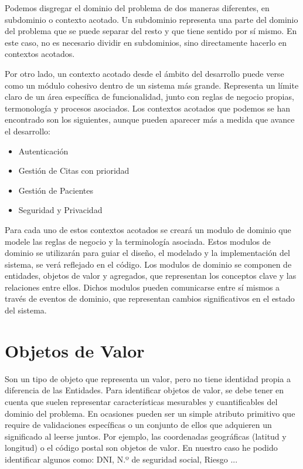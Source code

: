 Podemos disgregar el dominio del problema de dos maneras diferentes, en subdominio o contexto acotado.
Un subdominio representa una parte del dominio del problema que se puede separar del resto y que tiene sentido por sí mismo.
En este caso, no es necesario dividir en subdominios, sino directamente hacerlo en contextos acotados.

Por otro lado, un contexto acotado desde el ámbito del desarrollo puede verse como un módulo cohesivo dentro de un sistema más grande.
Representa un límite claro de un área específica de funcionalidad, junto con reglas de negocio propias, termonología y procesos asociados.
Los contextos acotados que podemos se han encontrado son los siguientes, aunque pueden aparecer más a medida que avance el desarrollo:
\begin{itemize}
    \item Autenticación
    \item Gestión de Citas con prioridad
    \item Gestión de Pacientes
    \item Seguridad y Privacidad
\end{itemize}

Para cada uno de estos contextos acotados se creará un modulo de dominio que modele las reglas de negocio y la terminología asociada.
Estos modulos de dominio se utilizarán para guiar el diseño, el modelado y la implementación del sistema, se verá reflejado en el código.
Los modulos de dominio se componen de entidades, objetos de valor y agregados, que representan los conceptos clave y las relaciones entre ellos.
Dichos modulos pueden comunicarse entre sí mismos a través de eventos de dominio, que representan cambios significativos en el estado del sistema.

\section*{Objetos de Valor}
Son un tipo de objeto que representa un valor, pero no tiene identidad propia a diferencia de las Entidades.
Para identificar objetos de valor, se debe tener en cuenta que suelen representar características mesurables y cuantificables del dominio del problema.
En ocasiones pueden ser un simple atributo primitivo que require de validaciones específicas o un conjunto de ellos que adquieren un significado al leerse juntos.
Por ejemplo, las coordenadas geográficas (latitud y longitud) o el código postal son objetos de valor.
En nuestro caso he podido identificar algunos como: DNI, N.º de seguridad social, Riesgo ...

